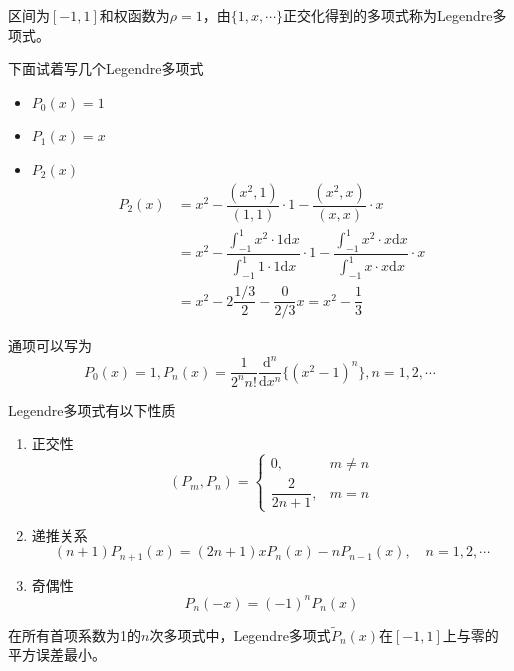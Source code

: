 \begin{definition}
    区间为$[-1,1]$和权函数为$\rho = 1$，由$\{1,x,\cdots\}$正交化得到的多项式称为Legendre多项式。
    
    下面试着写几个Legendre多项式
    \begin{itemize}
        \item $P_{0}(x) = 1$
        \item $P_{1}(x) = x$
        \item $P_{2}(x)$
        \[
            \begin{aligned}
                P_{2}(x) & =x^2-\dfrac{(x^2,1)}{(1,1)}\cdot 1-\dfrac{(x^2,x)}{(x,x)}\cdot x\\
                &=x^2-\dfrac{\int_{-1}^{1}x^2\cdot 1\mathrm{d}x}{\int_{-1}^{1}1\cdot 1\mathrm{d}x}\cdot 1-\dfrac{\int_{-1}^{1}x^2\cdot x\mathrm{d}x}{\int_{-1}^{1}x\cdot x\mathrm{d}x}\cdot x\\
                &=x^2-2\dfrac{1/3}{2}-\dfrac{0}{2/3}x = x^2-\dfrac{1}{3}
            \end{aligned}
        \]
    \end{itemize}
    通项可以写为
    \[
        P_{0}(x)=1,P_{n}(x)=\frac{1}{2^{n}n!}\frac{\mathrm{d}^{n}}{\mathrm{d}x^{n}}\{(x^{2}-1)^{n}\},n=1,2,\cdots 
    \]
\end{definition}
\begin{corollary}
    Legendre多项式有以下性质
    \begin{enumerate}
        \item 正交性
        \[
            (P_m,P_n) = \left\{
                \begin{array}{ll}
                    0, & m\neq n \\
                    \dfrac{2}{2n+1}, & m = n
                \end{array}
            \right.
        \]
        \item 递推关系
        \[
            (n+1)P_{n+1}(x) = (2n+1)xP_{n}(x)-nP_{n-1}(x),\quad n = 1,2,\cdots
        \]
        \item 奇偶性
        \[
            P_{n}(-x) = (-1)^{n}P_{n}(x)
        \]
    \end{enumerate}
\end{corollary}
\begin{theorem}
    在所有首项系数为1的$n$次多项式中，Legendre多项式$\tilde{P}_{n}(x)$在$[-1,1]$上与零的平方误差最小。
\end{theorem}
